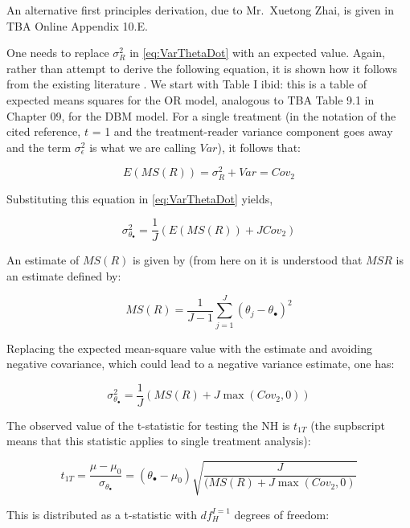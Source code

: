 \documentclass[
]{book}
\begin{document}
An alternative first principles derivation, due to Mr.~Xuetong Zhai, is given in TBA Online Appendix 10.E.

One needs to replace \(\sigma_{R}^{2}\) in \eqref{eq:VarThetaDot} with an expected value. Again, rather than attempt to derive the following equation, it is shown how it follows from the existing literature \citep{RN2508}. We start with Table I ibid: this is a table of expected means squares for the OR model, analogous to TBA Table 9.1 in Chapter 09, for the DBM model. For a single treatment (in the notation of the cited reference, \(t\) = 1 and the treatment-reader variance component goes away and the term \(\sigma_{\epsilon}^{2}\) is what we are calling \(Var\)), it follows that:

\[E(MS(R))=\sigma_{R}^{2}+Var=Cov_2\]

Substituting this equation in \eqref{eq:VarThetaDot} yields,

\begin{equation}
\sigma_{\theta_{\bullet}}^{2}=\frac{1}{J}(E(MS(R))+JCov_2)
\label{eq:VarThetaDot}
\end{equation}

An estimate of \(MS(R)\) is given by (from here on it is understood that \(MSR\) is an estimate defined by:

\begin{equation}
MS(R)=\frac{1}{J-1}\sum_{j=1}^{J}(\theta_j - \theta_{\bullet})^2
\label{eq:EstMsR1T}
\end{equation}

Replacing the expected mean-square value with the estimate and avoiding negative covariance, which could lead to a negative variance estimate, one has:

\begin{equation}
\sigma_{\theta_{\bullet}}^{2}=\frac{1}{J}(MS(R)+J\max(Cov_2,0))
\label{eq:EstVarThetaDot}
\end{equation}

The observed value of the t-statistic for testing the NH is \(t_{1T}\) (the supbscript means that this statistic applies to single treatment analysis):

\begin{equation}
t_{1T}=\frac{\mu-\mu_0}{\sigma_{\theta_{\bullet}}}=(\theta_{\bullet}-\mu_0)\sqrt{\frac{J}{(MS(R)+J\max(Cov_2,0)}}
\label{eq:DefTStat1T}
\end{equation}

This is distributed as a t-statistic with \(df_{H}^{I=1}\) degrees of freedom:
\end{document}
